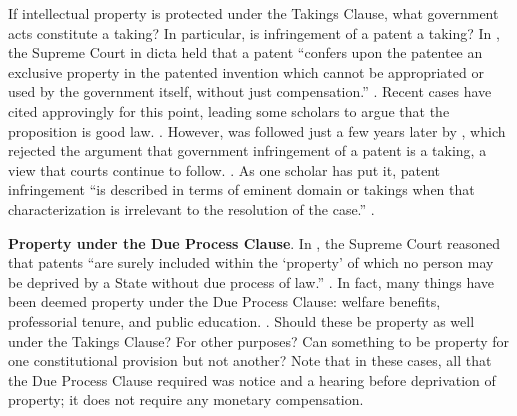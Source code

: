 \item If intellectual property is protected under the Takings Clause, what
government acts constitute a taking? In particular, is infringement of a patent
a taking? In , the Supreme Court in dicta held that a
patent ``confers upon the patentee an exclusive property in the patented
invention which cannot be appropriated or used by the government itself, without
just compensation.'' .
Recent cases have cited  approvingly for this point,
leading some scholars to argue that the proposition is good law. . However,  was followed just a few
years later by , which rejected the argument that
government infringement of a patent is a taking, a view that courts continue to
follow. . As one
scholar has put it, patent infringement ``is described in terms of eminent
domain or takings when that characterization is irrelevant to the resolution of
the case.'' .





\item \textbf{Property under the Due Process Clause}. In
, the Supreme Court reasoned that patents ``are surely
included within the `property' of which no person may be deprived by a State
without due process of law.'' . In fact, many
things have been deemed property under the Due Process Clause: welfare benefits,
professorial tenure, and public education. . Should these be property as well under the Takings
Clause? For other purposes? Can something to be property for one constitutional
provision but not another? Note that in these cases, all that the Due Process
Clause required was notice
and a hearing before deprivation of property; it does not require any monetary
compensation.



